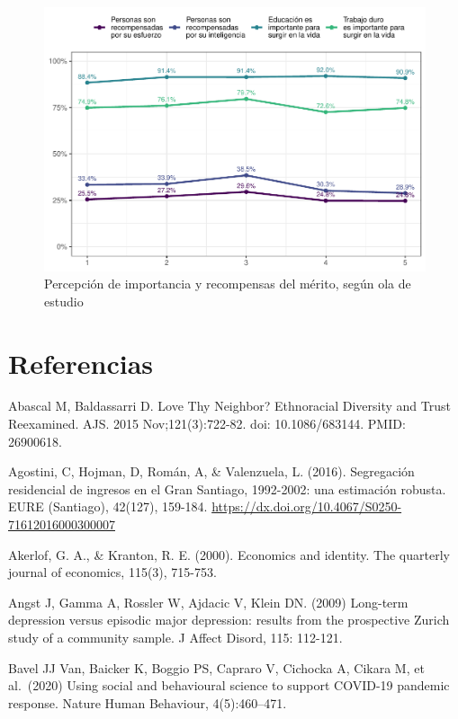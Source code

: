 \documentclass[
  12pt,
]{book}
\begin{document}
\begin{figure}

{\centering \includegraphics{reporte-elsoc_files/figure-latex/merit-wave-1} 

}

\caption{Percepción de importancia y recompensas del mérito, según ola de estudio}\label{fig:merit-wave}
\end{figure}

\hypertarget{referencias}{%
\chapter{Referencias}\label{referencias}}

Abascal M, Baldassarri D. Love Thy Neighbor? Ethnoracial Diversity and Trust Reexamined. AJS. 2015 Nov;121(3):722-82. doi: 10.1086/683144. PMID: 26900618.

Agostini, C, Hojman, D, Román, A, \& Valenzuela, L. (2016). Segregación residencial de ingresos en el Gran Santiago, 1992-2002: una estimación robusta. EURE (Santiago), 42(127), 159-184. \url{https://dx.doi.org/10.4067/S0250-71612016000300007}

Akerlof, G. A., \& Kranton, R. E. (2000). Economics and identity. The quarterly journal of economics, 115(3), 715-753.

Angst J, Gamma A, Rossler W, Ajdacic V, Klein DN. (2009) Long-term depression versus episodic major depression: results from the prospective Zurich study of a community sample. J Affect Disord, 115: 112-121.

Bavel JJ Van, Baicker K, Boggio PS, Capraro V, Cichocka A, Cikara M, et al.~(2020) Using social and behavioural science to support COVID-19 pandemic response. Nature Human Behaviour, 4(5):460--471.
\end{document}
